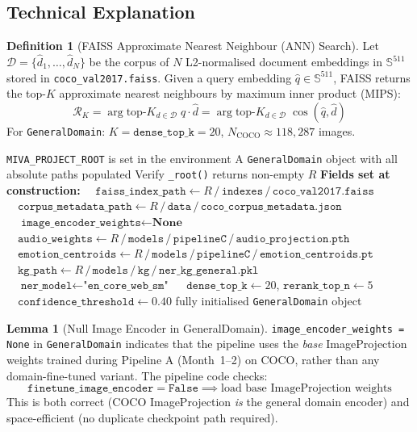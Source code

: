 \documentclass[12pt,a4paper]{article}
\theoremstyle{definition}
\newtheorem{lemma}[theorem]{Lemma}
\newtheorem{definition}[theorem]{Definition}
\theoremstyle{remark}
\begin{document}
\subsection{Technical Explanation}

\begin{definition}[FAISS Approximate Nearest Neighbour (ANN) Search]
Let $\mathcal{D} = \{\hat{d}_1, \ldots, \hat{d}_N\}$ be the corpus of
$N$ L2-normalised document embeddings in $\mathbb{S}^{511}$ stored in
\texttt{coco\_val2017.faiss}.
Given a query embedding $\hat{q} \in \mathbb{S}^{511}$, FAISS returns
the top-$K$ approximate nearest neighbours by maximum inner product (MIPS):
\[
  \mathcal{R}_K = \arg\text{top-}K_{d \in \mathcal{D}}\; \hat{q} \cdot \hat{d}
  = \arg\text{top-}K_{d \in \mathcal{D}}\; \cos(\hat{q}, \hat{d})
\]
For \texttt{GeneralDomain}: $K = \texttt{dense\_top\_k} = 20$,
$N_{\text{COCO}} \approx 118{,}287$ images.
\end{definition}

\begin{algorithm}[H]
\caption{\texttt{GeneralDomain} Instantiation}
\label{alg:gen_init}
\begin{algorithmic}[1]
\Require \texttt{MIVA\_PROJECT\_ROOT} is set in the environment
\Ensure A \texttt{GeneralDomain} object with all absolute paths populated
\State Verify \texttt{\_root()} returns non-empty $R$
\State \textbf{Fields set at construction:}
\State $\quad\texttt{faiss\_index\_path} \gets R\,/\,\texttt{indexes}\,/\,\texttt{coco\_val2017.faiss}$
\State $\quad\texttt{corpus\_metadata\_path} \gets R\,/\,\texttt{data}\,/\,\texttt{coco\_corpus\_metadata.json}$
\State $\quad\texttt{image\_encoder\_weights} \gets \textbf{None}$ 
\State $\quad\texttt{audio\_weights} \gets R\,/\,\texttt{models}\,/\,\texttt{pipelineC}\,/\,\texttt{audio\_projection.pth}$
\State $\quad\texttt{emotion\_centroids} \gets R\,/\,\texttt{models}\,/\,\texttt{pipelineC}\,/\,\texttt{emotion\_centroids.pt}$
\State $\quad\texttt{kg\_path} \gets R\,/\,\texttt{models}\,/\,\texttt{kg}\,/\,\texttt{ner\_kg\_general.pkl}$
\State $\quad\texttt{ner\_model} \gets \texttt{"en\_core\_web\_sm"}$
\State $\quad\texttt{dense\_top\_k} \gets 20$, $\texttt{rerank\_top\_n} \gets 5$
\State $\quad\texttt{confidence\_threshold} \gets 0.40$
\State \Return fully initialised \texttt{GeneralDomain} object
\end{algorithmic}
\end{algorithm}

\begin{lemma}[Null Image Encoder in GeneralDomain]
\texttt{image\_encoder\_weights = None} in \texttt{GeneralDomain}
indicates that the pipeline uses the \emph{base} ImageProjection weights
trained during Pipeline A (Month~1--2) on COCO, rather than any
domain-fine-tuned variant.
The pipeline code checks:
\[
  \texttt{finetune\_image\_encoder} = \texttt{False}
  \implies \text{load base ImageProjection weights}
\]
This is both correct (COCO ImageProjection \emph{is} the general domain
encoder) and space-efficient (no duplicate checkpoint path required).
\end{lemma}
\end{document}
